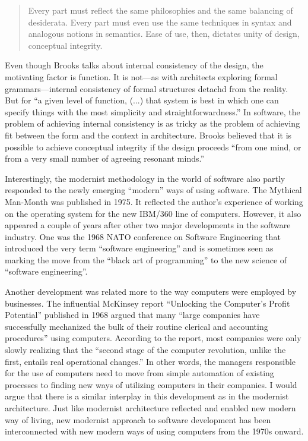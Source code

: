 \begin{quote}
Every part must reflect the same philosophies and the same balancing of de\-siderata.
Every part must even use the same techniques in syntax and analogous notions in semantics.
Ease of use, then, dictates unity of design, conceptual integrity.
\end{quote}

Even though Brooks talks about internal consistency of the design, the motivating factor
is function. It is not---as with architects exploring formal grammars---internal consistency
of formal structures detachd from the reality. But for ``a given level of function, (...) that
system is best in which one can specify things with the most simplicity and
straightforwardness.''
In software, the problem of achieving internal consistency is as tricky as the problem of achieving
fit between the form and the context in architecture. Brooks believed that it is possible to
achieve conceptual integrity if the design proceeds ``from one mind, or from a very small number
of agreeing resonant minds.''

Interestingly, the modernist methodology in the world of software also partly responded to
the newly emerging ``modern'' ways of using software. The Mythical Man-Month was published
in 1975. It reflected the author's experience of working on the operating system for the
new IBM/360 line of computers. However, it also appeared a couple of years after other two
major developments in the software industry. One was the 1968 NATO conference on Software
Engineering that introduced the very term ``software engineering'' and is sometimes seen as
marking the move from the ``black art of programming'' to the new science of ``software
engineering''.

Another development was related more to the way computers were employed by businesses.
The influential McKinsey report ``Unlocking the Computer's Profit Potential''
published in 1968 argued that many ``large companies have successfully mechanized the bulk
of their routine clerical and accounting procedures'' using computers. According to the report,
most companies were only slowly realizing that the ``second stage of the computer revolution,
unlike the first, entails real operational changes.''
In other words, the managers responsible for the use of computers need to move from simple
automation of existing processes to finding new ways of utilizing computers in their companies.
I would argue that there is a similar interplay in this development as in the modernist
architecture. Just like modernist architecture reflected and enabled new modern way of living,
new modernist approach to software development has been interconnected with new modern ways
of using computers from the 1970s onward.

